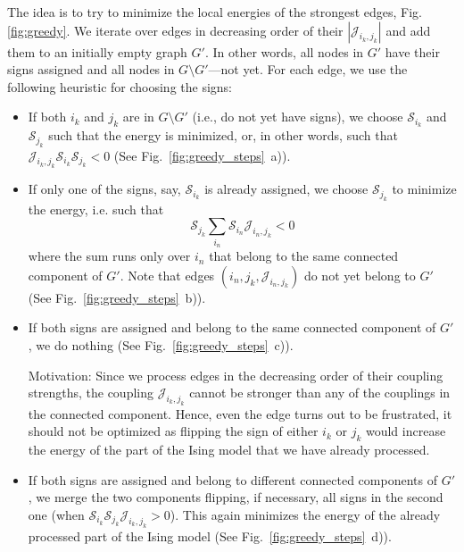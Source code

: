 The idea is to try to minimize the local energies of the strongest edges, Fig. \ref{fig:greedy}. We iterate over edges in decreasing order of their $|\mathcal{J}_{i_k,j_k}|$ and add them to an initially empty graph $G'$. In other words, all nodes in $G'$ have their signs assigned and all nodes in $G \setminus G'$---not yet. For each edge, we use the following heuristic for choosing the signs:

\begin{itemize}[topsep=0pt, noitemsep]
    \item If both $i_k$ and $j_k$ are in $G\setminus G'$ (i.e.,  do not yet have signs), we choose $\mathcal{S}_{i_k}$ and $\mathcal{S}_{j_k}$ such that the energy is minimized, or, in other words, such that $\mathcal{J}_{i_k,j_k} \mathcal{S}_{i_k} \mathcal{S}_{j_k} < 0$ (See Fig.~\ref{fig:greedy_steps}~a)).
    
    \item If only one of the signs, say, $\mathcal{S}_{i_k}$ is already assigned, we choose $\mathcal{S}_{j_k}$ to minimize the energy, i.e. such that
    \begin{equation*}
        \mathcal{S}_{j_k}
            \sum_{i_n} \mathcal{S}_{i_n} \mathcal{J}_{i_n,j_k} < 0
    \end{equation*}
    where the sum runs only over $i_n$ that belong to the same connected component of $G'$. Note that edges $(i_n, j_k, \mathcal{J}_{i_n, j_k})$ do not yet belong to $G'$ (See Fig.~\ref{fig:greedy_steps}~b)).

    \item If both signs are assigned and belong to the same connected component of $G'$, we do nothing (See Fig.~\ref{fig:greedy_steps}~c)).    
    
    Motivation: Since we process edges in the decreasing order of their coupling strengths, the coupling $\mathcal{J}_{i_k, j_k}$ cannot be stronger than any of the couplings in the connected component. Hence, even the edge turns out to be frustrated, it should not be optimized as flipping the sign of either $i_k$ or $j_k$ would increase the energy of the part of the Ising model that we have already processed.
    
    \item If both signs are assigned and belong to different connected components of $G'$, we merge the two components flipping, if necessary, all signs in the second one (when $\mathcal{S}_{i_k} \mathcal{S}_{j_k} \mathcal{J}_{i_k,j_k} > 0$). This again minimizes the energy of the already processed part of the Ising model (See Fig.~\ref{fig:greedy_steps}~d)).
\end{itemize}

